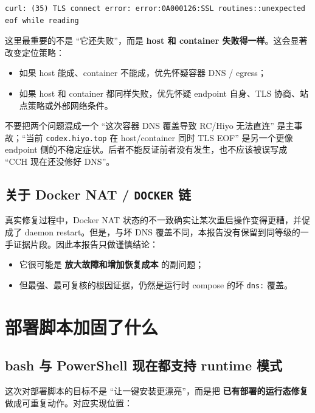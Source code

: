 \documentclass[a4paper]{article}
\begin{document}
\begin{lstlisting}[caption={当前 host 与容器对 codex.hiyo.top 的共同症状}]
curl: (35) TLS connect error: error:0A000126:SSL routines::unexpected eof while reading
\end{lstlisting}

这里最重要的不是 ``它还失败''，而是 \textbf{host 和 container 失败得一样}。这会显著改变定位策略：

\begin{itemize}
\item 如果 host 能成、container 不能成，优先怀疑容器 DNS / egress；
\item 如果 host 和 container 都同样失败，优先怀疑 endpoint 自身、TLS 协商、站点策略或外部网络条件。
\end{itemize}

\begin{riskbox}{不要把两个问题混成一个}
``这次容器 DNS 覆盖导致 RC/Hiyo 无法直连'' 是主事故；``当前 \texttt{codex.hiyo.top} 在 host/container 同时 TLS EOF'' 是另一个更像 endpoint 侧的不稳定症状。后者不能反证前者没有发生，也不应该被误写成 ``CCH 现在还没修好 DNS''。
\end{riskbox}

\subsection{关于 Docker NAT / \texttt{DOCKER} 链}

真实修复过程中，Docker NAT 状态的不一致确实让某次重启操作变得更糟，并促成了 daemon restart。但是，与坏 DNS 覆盖不同，本报告没有保留到同等级的一手证据片段。因此本报告只做谨慎结论：

\begin{itemize}
\item 它很可能是 \textbf{放大故障和增加恢复成本} 的副问题；
\item 但最强、最可复核的根因证据，仍然是运行时 compose 的坏 \texttt{dns:} 覆盖。
\end{itemize}

\section{部署脚本加固了什么}

\subsection{bash 与 PowerShell 现在都支持 runtime 模式}

这次对部署脚本的目标不是 ``让一键安装更漂亮''，而是把 \textbf{已有部署的运行态修复} 做成可重复动作。对应实现位置：
\end{document}
